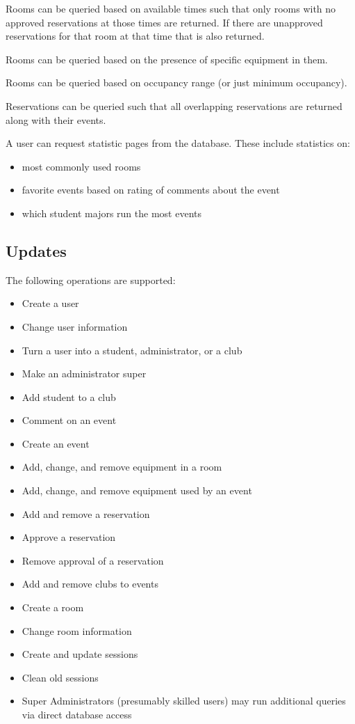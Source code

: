 \documentclass{article}
\begin{document}
Rooms can be queried based on available times such that only rooms with no approved reservations at those times are returned.
If there are unapproved reservations for that room at that time that is also returned.

Rooms can be queried based on the presence of specific equipment in them.

Rooms can be queried based on occupancy range (or just minimum occupancy).

Reservations can be queried such that all overlapping reservations are returned along with their events.

A user can request statistic pages from the database. These include statistics on:
\begin{itemize}
\item most commonly used rooms
\item favorite events based on rating of comments about the event
\item which student majors run the most events
\end{itemize}

\subsection{Updates}
The following operations are supported:
\begin{itemize}
\item Create a user
\item Change user information
\item Turn a user into a student, administrator, or a club
\item Make an administrator super
\item Add student to a club
\item Comment on an event
\item Create an event
\item Add, change, and remove equipment in a room
\item Add, change, and remove equipment used by an event
\item Add and remove a reservation
\item Approve a reservation
\item Remove approval of a reservation
\item Add and remove clubs to events
\item Create a room
\item Change room information
\item Create and update sessions
\item Clean old sessions
\item Super Administrators (presumably skilled users) may run additional queries via direct database access
\end{itemize}
\end{document}

